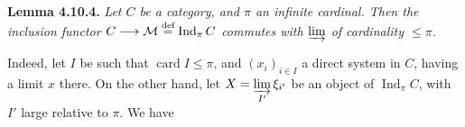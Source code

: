 \documentclass[11pt]{article}
\newcommand{\Ind}{\operatorname{Ind}}
\newcommand{\card}{\operatorname{card}}
\begin{document}
\textbf{Lemma 4.10.4.} \textit{Let $C$ be a category, and $\pi$ an infinite cardinal. Then the inclusion functor $C \longrightarrow \mathcal{M} \overset{\textup{def}}{=} \Ind_\pi C$ commutes with $\varinjlim$ of cardinality $\leqslant \pi$.}

Indeed, let $I$ be such that $\card I \leqslant \pi$, and $(x_i)_{i\in I}$ a direct system in $C$, having a limit $x$ there. On the other hand, let $X = \varinjlim\limits_{I'} \xi_{i'}$ be an object of $\Ind_\pi C$, with $I'$ large relative to $\pi$. We have
\end{document}

